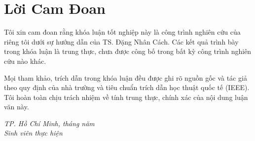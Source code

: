 \chapter*{Lời Cam Đoan}

Tôi xin cam đoan rằng khóa luận tốt nghiệp này là công trình nghiên cứu của riêng tôi dưới sự hướng dẫn của TS. Đặng Nhân Cách. Các kết quả trình bày trong khóa luận là trung thực, chưa được công bố trong bất kỳ công trình nghiên cứu nào khác.

Mọi tham khảo, trích dẫn trong khóa luận đều được ghi rõ nguồn gốc và tác giả theo quy định của nhà trường và tiêu chuẩn trích dẫn học thuật quốc tế (IEEE). Tôi hoàn toàn chịu trách nhiệm về tính trung thực, chính xác của nội dung luận văn này.

\vspace{2cm}
\begin{flushright}
  \textit{TP. Hồ Chí Minh, tháng \needvalue{} năm \needvalue{}}\\[1cm]
  \textit{Sinh viên thực hiện}\\[1.5cm]
  \textbf{}
\end{flushright}
\cleardoublepage
